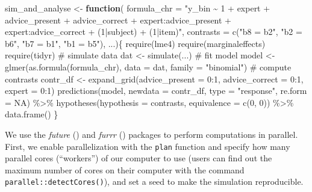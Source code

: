 \documentclass[
  man,
  floatsintext,
  longtable,
  a4paper,
  nolmodern,
  notxfonts,
  notimes,
  colorlinks=true,linkcolor=blue,citecolor=blue,urlcolor=blue]{apa7}
\newenvironment{Shaded}{\begin{snugshade}}{\end{snugshade}}
\newcommand{\AttributeTok}[1]{\textcolor[rgb]{0.40,0.45,0.13}{#1}}
\newcommand{\CommentTok}[1]{\textcolor[rgb]{0.37,0.37,0.37}{#1}}
\newcommand{\ConstantTok}[1]{\textcolor[rgb]{0.56,0.35,0.01}{#1}}
\newcommand{\ControlFlowTok}[1]{\textcolor[rgb]{0.00,0.23,0.31}{\textbf{#1}}}
\newcommand{\DecValTok}[1]{\textcolor[rgb]{0.68,0.00,0.00}{#1}}
\newcommand{\FunctionTok}[1]{\textcolor[rgb]{0.28,0.35,0.67}{#1}}
\newcommand{\NormalTok}[1]{\textcolor[rgb]{0.00,0.23,0.31}{#1}}
\newcommand{\OtherTok}[1]{\textcolor[rgb]{0.00,0.23,0.31}{#1}}
\newcommand{\SpecialCharTok}[1]{\textcolor[rgb]{0.37,0.37,0.37}{#1}}
\newcommand{\StringTok}[1]{\textcolor[rgb]{0.13,0.47,0.30}{#1}}
\begin{document}
\begin{Shaded}
\begin{Highlighting}[]
\NormalTok{sim\_and\_analyse }\OtherTok{\textless{}{-}} \ControlFlowTok{function}\NormalTok{(}
  \AttributeTok{formula\_chr =} \StringTok{"y\_bin \textasciitilde{} 1 + expert + advice\_present + advice\_correct + }
\StringTok{    expert:advice\_present + expert:advice\_correct + (1|subject) + (1|item)"}\NormalTok{,}
  \AttributeTok{contrasts =} \FunctionTok{c}\NormalTok{(}\StringTok{"b8 = b2"}\NormalTok{, }\StringTok{"b2 = b6"}\NormalTok{, }\StringTok{"b7 = b1"}\NormalTok{, }\StringTok{"b1 = b5"}\NormalTok{), ...)\{}
  \FunctionTok{require}\NormalTok{(lme4)}
  \FunctionTok{require}\NormalTok{(marginaleffects)}
  \FunctionTok{require}\NormalTok{(tidyr)}
  \CommentTok{\# simulate data}
\NormalTok{  dat }\OtherTok{\textless{}{-}} \FunctionTok{simulate}\NormalTok{(...)}
  \CommentTok{\# fit model}
\NormalTok{  model }\OtherTok{\textless{}{-}} \FunctionTok{glmer}\NormalTok{(}\FunctionTok{as.formula}\NormalTok{(formula\_chr), }\AttributeTok{data =}\NormalTok{ dat, }\AttributeTok{family =} \StringTok{"binomial"}\NormalTok{)}
  \CommentTok{\# compute contrasts}
\NormalTok{  contr\_df }\OtherTok{\textless{}{-}} \FunctionTok{expand\_grid}\NormalTok{(}\AttributeTok{advice\_present =} \DecValTok{0}\SpecialCharTok{:}\DecValTok{1}\NormalTok{, }\AttributeTok{advice\_correct =} \DecValTok{0}\SpecialCharTok{:}\DecValTok{1}\NormalTok{,}
    \AttributeTok{expert =} \DecValTok{0}\SpecialCharTok{:}\DecValTok{1}\NormalTok{)}
  \FunctionTok{predictions}\NormalTok{(model, }\AttributeTok{newdata =}\NormalTok{ contr\_df, }\AttributeTok{type =} \StringTok{"response"}\NormalTok{, }\AttributeTok{re.form =} \ConstantTok{NA}\NormalTok{) }\SpecialCharTok{\%\textgreater{}\%}
    \FunctionTok{hypotheses}\NormalTok{(}\AttributeTok{hypothesis =}\NormalTok{ contrasts, }\AttributeTok{equivalence =} \FunctionTok{c}\NormalTok{(}\DecValTok{0}\NormalTok{, }\DecValTok{0}\NormalTok{)) }\SpecialCharTok{\%\textgreater{}\%}
    \FunctionTok{data.frame}\NormalTok{()}
\NormalTok{\}}
\end{Highlighting}
\end{Shaded}

We use the \emph{future} ()
and \emph{furrr} ()
packages to perform computations in parallel. First, we enable
parallelization with the \texttt{plan} function and specify how many
parallel cores (``workers'') of our computer to use (users can find out
the maximum number of cores on their computer with the command
\texttt{parallel::detectCores()}), and set a seed to make the simulation
reproducible.
\end{document}
